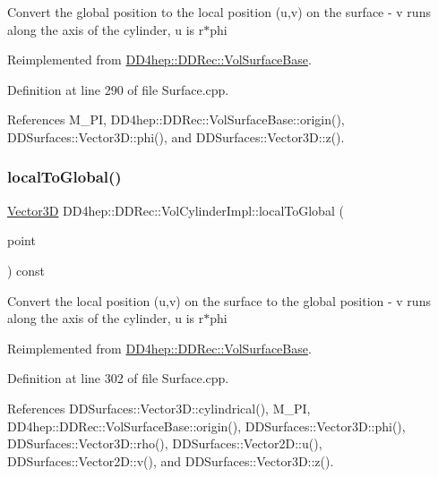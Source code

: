 Convert the global position to the local position (u,v) on the surface -\/ v runs along the axis of the cylinder, u is r$\ast$phi 

Reimplemented from \hyperlink{class_d_d4hep_1_1_d_d_rec_1_1_vol_surface_base_a9f2549dc5b7d2fbf58d1ef8c6699b49f}{D\+D4hep\+::\+D\+D\+Rec\+::\+Vol\+Surface\+Base}.



Definition at line 290 of file Surface.\+cpp.



References M\+\_\+\+PI, D\+D4hep\+::\+D\+D\+Rec\+::\+Vol\+Surface\+Base\+::origin(), D\+D\+Surfaces\+::\+Vector3\+D\+::phi(), and D\+D\+Surfaces\+::\+Vector3\+D\+::z().

\hypertarget{class_d_d4hep_1_1_d_d_rec_1_1_vol_cylinder_impl_afea034d9cc2ea238ca37e867b368df60}{}\label{class_d_d4hep_1_1_d_d_rec_1_1_vol_cylinder_impl_afea034d9cc2ea238ca37e867b368df60} 
\subsubsection{\texorpdfstring{local\+To\+Global()}{localToGlobal()}}
{\footnotesize\ttfamily \hyperlink{class_d_d_surfaces_1_1_vector3_d}{Vector3D} D\+D4hep\+::\+D\+D\+Rec\+::\+Vol\+Cylinder\+Impl\+::local\+To\+Global (\begin{DoxyParamCaption}\item[{const \hyperlink{class_d_d_surfaces_1_1_vector2_d}{Vector2D} \&}]{point }\end{DoxyParamCaption}) const\hspace{0.3cm}{\ttfamily [virtual]}}

Convert the local position (u,v) on the surface to the global position -\/ v runs along the axis of the cylinder, u is r$\ast$phi 

Reimplemented from \hyperlink{class_d_d4hep_1_1_d_d_rec_1_1_vol_surface_base_a9cf248895aeb84a7e2cd2b2068661397}{D\+D4hep\+::\+D\+D\+Rec\+::\+Vol\+Surface\+Base}.



Definition at line 302 of file Surface.\+cpp.



References D\+D\+Surfaces\+::\+Vector3\+D\+::cylindrical(), M\+\_\+\+PI, D\+D4hep\+::\+D\+D\+Rec\+::\+Vol\+Surface\+Base\+::origin(), D\+D\+Surfaces\+::\+Vector3\+D\+::phi(), D\+D\+Surfaces\+::\+Vector3\+D\+::rho(), D\+D\+Surfaces\+::\+Vector2\+D\+::u(), D\+D\+Surfaces\+::\+Vector2\+D\+::v(), and D\+D\+Surfaces\+::\+Vector3\+D\+::z().

